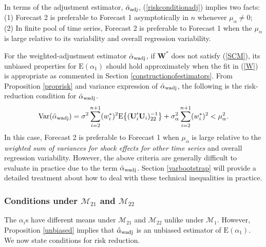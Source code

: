\documentclass[11pt]{article}
\def\mbf#1{\mathbf{#1}} %
\def\mrm#1{\mathrm{#1}} %
\def\mc#1{\mathcal{#1}} %
\def\E#1{\mathrm{E}(#1)} %
\def\var#1{\mathrm{Var}(#1)} %
\theoremstyle{definition}
\begin{document}
In terms of the adjustment estimator, $\hat{\alpha}_{\rm adj}$, (\ref{riskconditionadj}) implies two facts: (1) Forecast 2 is preferable to Forecast 1 asymptotically in $n$ 
whenever $\mu_{\alpha} \neq 0$; (2) In finite pool of time series, Forecast 2 is preferable to 
Forecast 1 when the $\mu_{\alpha}$ is large relative to its variability and 
overall regression variability.   %

For the weighted-adjustment estimator $\hat{\alpha}_{\rm wadj}$, if  $\mathbf{W}^*$ does not satisfy (\ref{SCM}), its unbiased properties for $\E{\alpha_1}$ should hold approximately when the fit in (\ref{W}) is appropriate as commented in Section \ref{constructionofestimators}. From Proposition \ref{proprisk} and variance expression of $\hat{\alpha}_{\rm wadj}$, the following is the risk-reduction condition for $\hat{\alpha}_{\rm wadj}$.
\begin{align*}
\var{\hat{\alpha}_{\rm wadj}}
 = \sigma^2\sum_{i=2}^{n+1}(w_i^*)^2\mrm{E}\big\{(\mbf{U}'_i\mbf{U}_i)^{-1}_{22}\big\}+\sigma^2_{\alpha}\sum_{i=2}^{n+1}(w_i^*)^2 < \mu_{\alpha}^2.
\end{align*}
In this case, Forecast 2 is preferable to Forecast 1 when $\mu_{\alpha}$ is large relative to the \emph{weighted sum of variances for shock effects for other time series} and overall regression variability.  However, the above criteria are generally difficult to evaluate in practice due to the term $\hat{\alpha}_{\rm wadj}$. Section  \ref{varbootstrap} will provide a detailed treatment about how to deal with these technical inequalities in practice.


\subsubsection{Conditions under $\mc{M}_{21}$ and $\mc{M}_{22}$}
\label{conditionsm2122}
The $\alpha_i$s have different means under $\mc{M}_{21}$ and $\mc{M}_{22}$ unlike under $\mc{M}_1$. %
However, Proposition \ref{unbiased} implies that $\hat{\alpha}_{\rm wadj}$ is an unbiased estimator of $\E{\alpha_1}$. %
We now state conditions for risk reduction.
\end{document}
